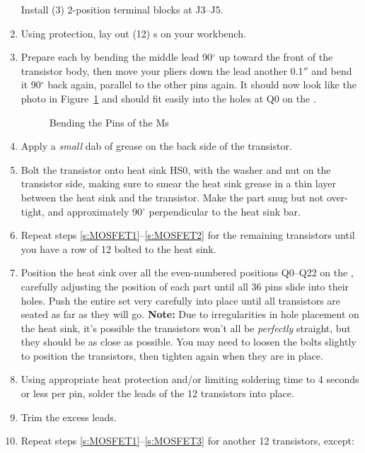 \documentclass[letterpaper,twoside,onecolumn,openright,final]{memoir}
\begin{document}
\begin{enumerate}
	Install (3) 2-position terminal blocks at J3--J5.
\item\label{s:MOSFET1}
	Using  protection, lay out (12) s on your workbench.
\item	Prepare each  by bending the middle lead 90$^\circ$ up toward the front
	of the transistor body, then move your pliers down the lead another 0.1$''$ and bend it
	90$^\circ$
	back again, parallel to the other pins again.  It should now look like the photo
	in Figure~\ref{fig:mosfet} and should fit
	easily into the holes at Q0 on the .
\begin{figure}
	\centerline{ }
	\caption{Bending the Pins of the Ms\label{fig:mosfet}}
\end{figure}
\item	Apply a \emph{small} dab of  grease on the back side of the transistor.
\item\label{s:MOSFET2}
	Bolt the transistor onto heat sink HS0, with the washer and nut on the transistor side,
	making sure to smear the heat sink grease in a thin layer between the heat sink and
	the transistor.  Make the part snug but not over-tight, and approximately 90$^\circ$
	perpendicular to the heat sink bar.
\item	Repeat steps \ref{s:MOSFET1}--\ref{s:MOSFET2} for the remaining transistors until you have
	a row of 12 bolted to the heat sink.
\item	Position the heat sink over all the even-numbered positions Q0--Q22 on the ,
	carefully adjusting the position of each part until all 36 pins slide into their holes.
	Push the entire set very carefully into place until all transistors are seated as far as they
	will go.  {\bfseries Note:} Due to irregularities in hole placement on the heat sink, it's
	possible the transistors won't all be \emph{perfectly} straight, but they should be as
	close as possible.  You may need to loosen the bolts slightly to position the 
	transistors, then tighten again when they are in place.
\item	Using appropriate heat protection and/or limiting soldering time to 4 seconds or less per
	pin, solder the leads of the 12 transistors into place.  
\item\label{s:MOSFET3}
	Trim the excess leads.
\item	Repeat steps \ref{s:MOSFET1}--\ref{s:MOSFET3} for another 12 transistors, except:

\end{enumerate}
\end{document}
